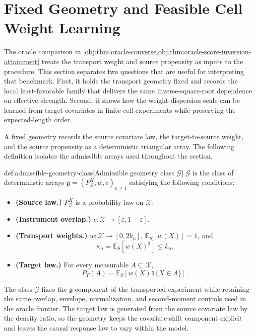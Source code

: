 \section{Fixed Geometry and Feasible Cell Weight Learning}

The oracle comparison in \cref{obj:thm:oracle-converse,obj:thm:oracle-score-inversion-attainment} treats the transport weight and source propensity as inputs to the procedure.  This section separates two questions that are useful for interpreting that benchmark.  First, it holds the transport geometry fixed and records the local least-favorable family that delivers the same inverse-square-root dependence on effective strength.  Second, it shows how the weight-dispersion scale can be learned from target covariates in finite-cell experiments while preserving the expected-length order.

A fixed geometry records the source covariate law, the target-to-source weight, and the source propensity as a deterministic triangular array.  The following definition isolates the admissible arrays used throughout the section.

\begin{definitionv}{def:admissible-geometry-class}[Admissible geometry class \(\mathcal G\)]
\(\mathcal G\) is the class of deterministic arrays \(\mathfrak g=(P_S^X,w,e)_{n\ge1}\) satisfying the following conditions:
\begin{itemize}
\item \textbf{(Source law.)} \(P_S^X\) is a probability law on \(\mathcal X\).
\item \textbf{(Instrument overlap.)} \(e:\mathcal X\to[\varepsilon,1-\varepsilon]\).
\item \textbf{(Transport weights.)} \(w:\mathcal X\to[0,2k_n]\), \(\mathbb E_S[w(X)]=1\), and
\[
\kappa_n=\mathbb E_S[w(X)^2]\le k_n .
\]
\item \textbf{(Target law.)} For every measurable \(A\subseteq\mathcal X\),
\[
P_T(A)=\mathbb E_S\!\left[w(X)\mathbf 1\{X\in A\}\right].
\]
\end{itemize}
\end{definitionv}

The class \(\mathcal G\) fixes the \(\mathfrak g\) component of the transported experiment while retaining the same overlap, envelope, normalization, and second-moment controls used in the oracle frontier.  The target law is generated from the source covariate law by the density ratio, so the geometry keeps the covariate-shift component explicit and leaves the causal response law to vary within the model.

